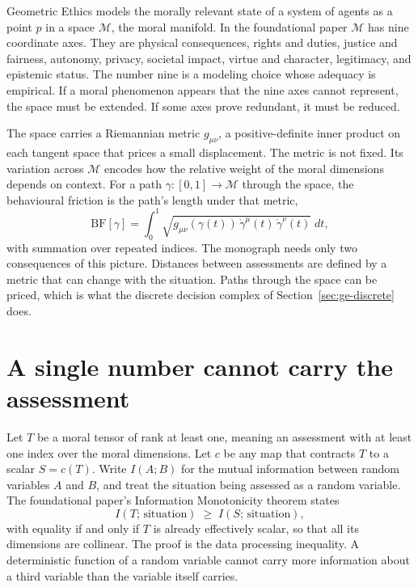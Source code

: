 Geometric Ethics models the morally relevant state of a system of agents as a point $p$ in a
space $\mathcal{M}$, the moral manifold. In the foundational paper $\mathcal{M}$ has nine
coordinate axes.
They are physical consequences, rights and duties, justice and fairness, autonomy, privacy,
societal impact, virtue and character, legitimacy, and epistemic status. The number nine is a
modeling choice whose adequacy is empirical. If a moral phenomenon appears that the nine axes
cannot represent, the space must be extended. If some axes prove redundant, it must be reduced.

The space carries a Riemannian metric $g_{\mu\nu}$, a positive-definite inner product on each
tangent space that prices a small displacement. The metric is not fixed. Its variation across
$\mathcal{M}$ encodes how the relative weight of the moral dimensions depends on context.
For a path $\gamma\colon[0,1]\to\mathcal{M}$ through the space, the behavioural friction is the
path's length under that metric,
\begin{equation}
\mathrm{BF}[\gamma] = \int_0^1 \sqrt{g_{\mu\nu}(\gamma(t))\,\dot\gamma^{\mu}(t)\,\dot\gamma^{\nu}(t)}\;dt ,
\label{eq:ge-friction}
\end{equation}
with summation over repeated indices.
The monograph needs only two consequences of this picture. Distances between assessments are
defined by a metric that can change with the situation. Paths through the space can be priced,
which is what the discrete decision complex of Section~\ref{sec:ge-discrete} does.

\section{A single number cannot carry the assessment}\label{sec:ge-scalar}

Let $T$ be a moral tensor of rank at least one, meaning an assessment with at least one index over
the moral dimensions. Let $c$ be any map that contracts $T$ to a scalar $S = c(T)$. Write
$I(A;B)$ for the mutual information between random variables $A$ and $B$, and treat the situation
being assessed as a random variable. The foundational paper's Information Monotonicity theorem
states
\begin{equation}
I(T;\,\text{situation}) \;\geq\; I(S;\,\text{situation}),
\label{eq:ge-infomono}
\end{equation}
with equality if and only if $T$ is already effectively scalar, so that all its dimensions are
collinear.
The proof is the data processing inequality. A deterministic function of a random variable
cannot carry more information about a third variable than the variable itself carries.

